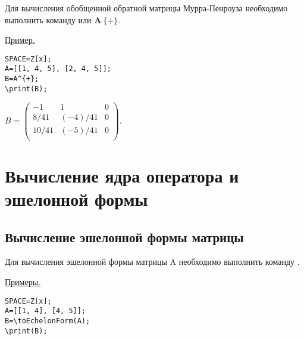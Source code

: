 Для вычисления обобщенной обратной матрицы Мурра-Пенроуза необходимо выполнить команду  
 или $\mathbf{A\widehat{\ } \{+\}}$. 

\underline{Пример. }

\vspace*{-2mm}
\begin{verbatim}
SPACE=Z[x];
A=[[1, 4, 5], [2, 4, 5]];
B=A^{+};
\print(B);
\end{verbatim}

{$
B =  \left(\begin{array}{ccc}
-1& 1& 0\\
 8/41&  (-4)/41& 0\\
 10/41& (-5)/41& 0\\ \end{array}\right).$}
 
\section{Вычисление ядра оператора и эшелонной формы}

\subsection{Вычисление эшелонной формы матрицы}
Для вычисления эшелонной формы матрицы A необходимо выполнить команду  
 . 

\underline{Примеры. }

\vspace*{-2mm}
\begin{verbatim}
SPACE=Z[x]; 
A=[[1, 4], [4, 5]];
B=\toEchelonForm(A); 
\print(B);
\end{verbatim}


